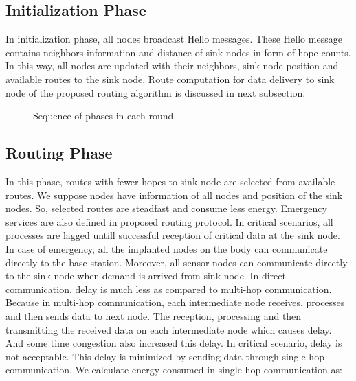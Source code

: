 \documentclass[journal]{IEEEtran}
\begin{document}
\subsection{Initialization Phase}
In initialization phase, all nodes broadcast Hello messages. These Hello message contains neighbors information and distance of sink nodes in form of hope-counts. In this way, all nodes are updated with their neighbors, sink node position and available routes to the sink node. Route computation for data delivery to sink node of the proposed routing algorithm is discussed in next subsection.

\begin{figure*}[ht]
  \centering
  \caption{Sequence of phases in each round}\label{fig2}
\end{figure*}


\subsection{Routing Phase}
In this phase, routes with fewer hopes to sink node are selected from available routes. We suppose nodes have information of all nodes and position of the sink nodes. So, selected routes are steadfast and consume less energy. Emergency services are also defined in proposed routing protocol. In critical scenarios, all processes are lagged untill successful reception of critical data at the sink node. In case of emergency, all the implanted nodes on the body can communicate directly to the base station. Moreover, all sensor nodes can communicate directly to the sink node when demand is arrived from sink node. In direct communication, delay is much less as compared to multi-hop communication. Because in multi-hop communication, each intermediate node receives, processes and then sends data to next node. The reception, processing and then transmitting the received data on each intermediate node which causes delay. And some time congestion also increased this delay. In critical scenario, delay is not acceptable. This delay is minimized by sending data through single-hop communication. We calculate energy consumed in single-hop communication  as:
\end{document}
